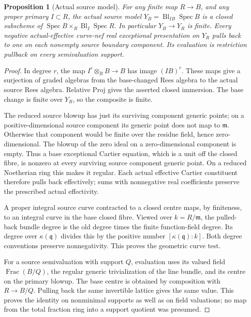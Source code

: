 \documentclass[11pt]{article}
\newtheorem{proposition}{Proposition}
\begin{document}
\begin{proposition}[Actual source model]
For any finite map \(R\to B\), and any proper primary \(I\subset R\),
the actual source model \(Y_B=\operatorname{Bl}_{IB}\operatorname{Spec}B\)
is a closed subscheme of
\(\operatorname{Spec}B\times_R\operatorname{Bl}_I\operatorname{Spec}R\).
In particular \(Y_B\to Y_R\) is finite.
Every negative actual-effective curve-nef real exceptional presentation
on \(Y_R\) pulls back to one on each nonempty source boundary component.
Its evaluation is restriction pullback on every semivaluation support.
\end{proposition}
\begin{proof}
In degree \(r\), the map \(I^r\otimes_R B\to B\) has image
\((IB)^r\). These maps give a surjection of graded algebras from the
base-changed Rees algebra to the actual source Rees algebra. Relative
Proj gives the asserted closed immersion. The base change is finite
over \(Y_R\), so the composite is finite.

The reduced source blowup has just its surviving component generic
points; on a positive-dimensional source component its generic point
does not map to \(\mathfrak m\). Otherwise that component would be finite
over the residue field, hence zero-dimensional. The blowup of the zero
ideal on a zero-dimensional component is empty. Thus a base exceptional
Cartier equation, which is a unit off the closed fibre, is nonzero at
every surviving source component generic point. On a reduced Noetherian
ring this makes it regular. Each actual effective Cartier constituent
therefore pulls back effectively; sums with nonnegative real
coefficients preserve the prescribed actual effectivity.

A proper integral source curve contracted to a closed centre maps,
by finiteness, to an integral curve in the base closed fibre.
Viewed over \(k=R/\mathfrak m\), the pulled-back bundle degree is
the old degree times the finite function-field degree. Its degree
over \(\kappa(\mathfrak q)\) divides this by the positive number
\([\kappa(\mathfrak q):k]\). Both degree conventions preserve
nonnegativity. This proves the geometric curve test.

For a source semivaluation with support \(Q\), evaluation uses its
valued field \(\operatorname{Frac}(B/Q)\), the regular generic
trivialization of the line bundle, and its centre on the primary
blowup. The base centre is obtained by composition with
\(R\to B/Q\). Pulling back the same invertible lattice gives the same
value. This proves the identity on nonminimal supports as well as on
field valuations; no map from the total fraction ring into a support
quotient was presumed.
\end{proof}
\end{document}

